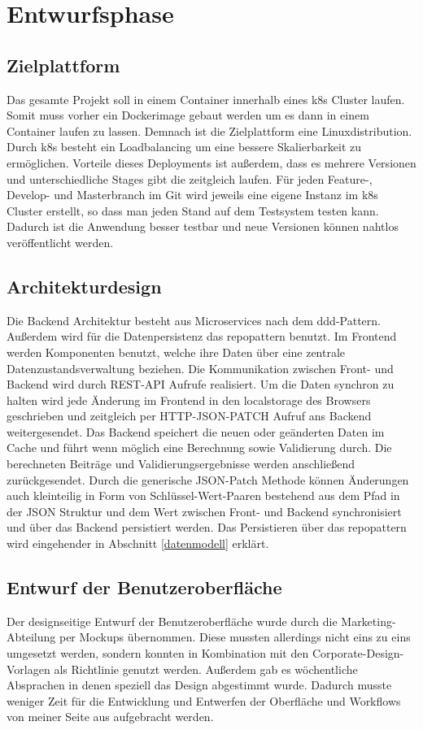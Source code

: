 \section{Entwurfsphase}
\label{entwurfsphase}
\subsection{Zielplattform}
\label{zielplattform}
Das gesamte Projekt soll in einem \gls{Container} innerhalb eines \gls{k8s} Cluster laufen. Somit muss vorher ein Dockerimage gebaut werden um es dann in einem Container laufen zu lassen. Demnach ist die Zielplattform eine Linuxdistribution. Durch \gls{k8s} besteht ein Loadbalancing um eine bessere Skalierbarkeit zu ermöglichen. Vorteile dieses Deployments ist außerdem, dass es mehrere Versionen und unterschiedliche Stages gibt die zeitgleich laufen. Für jeden Feature-, Develop- und Masterbranch im Git wird jeweils eine eigene Instanz im \gls{k8s} Cluster erstellt, so dass man jeden Stand auf dem Testsystem testen kann. Dadurch ist die Anwendung besser testbar und neue Versionen können nahtlos veröffentlicht werden.
\subsection{Architekturdesign}
\label{architekturdesign}
Die Backend Architektur besteht aus Microservices nach dem \gls{ddd}-Pattern. Außerdem wird für die Datenpersistenz das \gls{repopattern} benutzt. Im Frontend werden Komponenten benutzt, welche ihre Daten über eine zentrale Datenzustandsverwaltung beziehen. Die Kommunikation zwischen Front- und Backend wird durch REST-API Aufrufe realisiert. Um die Daten synchron zu halten wird jede Änderung im Frontend in den \gls{localstorage} des Browsers geschrieben und zeitgleich per HTTP-JSON-PATCH Aufruf ans Backend weitergesendet. Das Backend speichert die neuen oder geänderten Daten im Cache und führt wenn möglich eine Berechnung sowie Validierung durch. Die berechneten Beiträge und Validierungsergebnisse werden anschließend zurückgesendet. Durch die generische JSON-Patch Methode können Änderungen auch kleinteilig in Form von Schlüssel-Wert-Paaren bestehend aus dem Pfad in der JSON Struktur und dem Wert zwischen Front- und Backend synchronisiert und über das Backend persistiert werden. Das Persistieren über das \gls{repopattern} wird eingehender in Abschnitt \ref{datenmodell} erklärt.
\subsection{Entwurf der Benutzeroberfläche}
\label{benutzeroberfläche}
Der designseitige Entwurf der Benutzeroberfläche wurde durch die Marketing-Abteilung per Mockups übernommen. Diese mussten allerdings nicht eins zu eins umgesetzt werden, sondern konnten in Kombination mit den Corporate-Design-Vorlagen als Richtlinie genutzt werden. Außerdem gab es wöchentliche Absprachen in denen speziell das Design abgestimmt wurde. Dadurch musste weniger Zeit für die Entwicklung und Entwerfen der Oberfläche und Workflows von meiner Seite aus aufgebracht werden.
